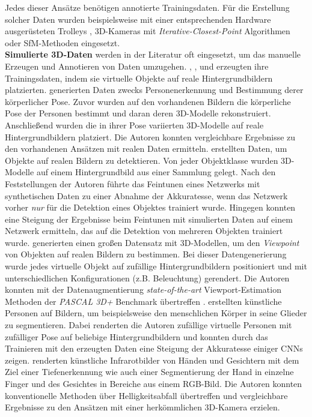 Jedes dieser Ansätze benötigen annotierte Trainingsdaten. Für die Erstellung solcher Daten wurden beispielsweise mit einer entsprechenden Hardware ausgerüsteten Trolleys \cite{huitlTUMindoorExtensiveImage2012}, 3D-Kameras mit \textit{Iterative-Closest-Point} Algorithmen \cite{izadiKinectFusionRealtime3D2011} oder SfM-Methoden \cite{kendallPoseNetConvolutionalNetwork2015} eingesetzt.
\\
\textbf{Simulierte 3D-Daten} werden in der Literatur oft eingesetzt, um das manuelle Erzeugen und Annotieren von Daten umzugehen. \citet{pishchulinArticulatedPeopleDetection2012a}, \citet{pengLearningDeepObject2015}, \citet{suRenderCNNViewpoint2015} und \citet{varolLearningSyntheticHumans2017} erzeugten ihre Trainingsdaten, indem sie virtuelle Objekte auf reale Hintergrundbildern platzierten. \citet{pishchulinArticulatedPeopleDetection2012a} generierten Daten zwecks Personenerkennung und Bestimmung derer körperlicher Pose. Zuvor wurden auf den vorhandenen Bildern die körperliche Pose der Personen bestimmt und daran deren 3D-Modelle rekonstruiert. Anschließend wurden die in ihrer Pose variierten 3D-Modelle auf reale Hintergrundbildern platziert. Die Autoren konnten vergleichbare Ergebnisse zu den vorhandenen Ansätzen mit realen Daten ermitteln. \citet{pengLearningDeepObject2015} erstellten Daten, um Objekte auf realen Bildern zu detektieren. Von jeder Objektklasse wurden 3D-Modelle auf einem Hintergrundbild aus einer Sammlung gelegt. Nach den Feststellungen der Autoren führte das Feintunen eines Netzwerks mit synthetischen Daten zu einer Abnahme der Akkuratesse, wenn das Netzwerk vorher \textit{nur} für die Detektion eines Objektes trainiert wurde. Hingegen konnten \citet{pengLearningDeepObject2015} eine Steigung der Ergebnisse beim Feintunen mit simulierten Daten auf einem Netzwerk ermitteln, das auf die Detektion von mehreren Objekten trainiert wurde. \citet{suRenderCNNViewpoint2015} generierten einen großen Datensatz mit 3D-Modellen, um den \textit{Viewpoint} von Objekten auf realen Bildern zu bestimmen. Bei dieser Datengenerierung wurde jedes virtuelle Objekt auf zufällige Hintergrundbildern positioniert und mit unterschiedlichen Konfigurationen (z.B. Beleuchtung) gerendert. Die Autoren konnten mit der Datenaugmentierung \textit{state-of-the-art} Viewport-Estimation Methoden der \textit{PASCAL 3D+}\cite{xiangPASCALBenchmark3D2014} Benchmark übertreffen \cite{suRenderCNNViewpoint2015}. \citet{varolLearningSyntheticHumans2017} erstellten künstliche Personen auf Bildern, um beispielsweise den menschlichen Körper in seine Glieder zu segmentieren. Dabei renderten die Autoren zufällige virtuelle Personen mit zufälliger Pose auf beliebige Hintergrundbildern und konnten durch das Trainieren mit den erzeugten Daten eine Steigung der Akkuratesse einiger CNNs zeigen. \citet{fanelloLearningBeDepth2014} renderten künstliche Infrarotbilder von Händen und Gesichtern mit dem Ziel einer Tiefenerkennung wie auch einer Segmentierung der Hand in einzelne Finger und des Gesichtes in Bereiche aus einem RGB-Bild. Die Autoren konnten konventionelle Methoden über Helligkeitsabfall übertreffen und vergleichbare Ergebnisse zu den Ansätzen mit einer herkömmlichen 3D-Kamera erzielen. \citet{dosovitskiyFlowNetLearningOptical2015} 